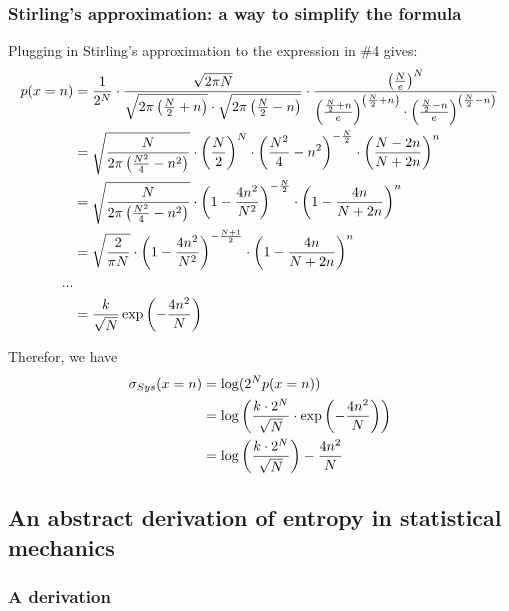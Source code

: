 \documentclass{paper}
\begin{document}
\subsubsection{Stirling's approximation: a way to simplify the formula}

\par Plugging in Stirling's approximation to the expression in \#4 gives:
    \begin{align*}
        p(x=n) 
        &= \frac{1}{2^N} \cdot \frac{\sqrt{2\pi N}}{\sqrt{2\pi \left(\frac{N}{2} + n\right)} \cdot \sqrt{2\pi \left(\frac{N}{2} - n\right)}} \cdot \frac{\left(\frac{N}{e}\right)^N}{\left(\frac{\frac{N}{2} + n}{e}\right)^{\left(\frac{N}{2} + n\right)} \cdot \left(\frac{\frac{N}{2} - n}{e}\right)^{\left(\frac{N}{2} - n\right)}}\\
        &= \sqrt{\frac{N}{2\pi \left(\frac{N^2}{4} - n^2\right)}} \cdot \left(\frac{N}{2}\right)^N \cdot \left(\frac{N^2}{4} - n^2\right)^{-\frac{N}{2}} \cdot \left(\frac{N-2n}{N+2n}\right)^n \\
        &= \sqrt{\frac{N}{2\pi \left(\frac{N^2}{4} - n^2\right)}} \cdot \left(1 - \frac{4n^2}{N^2}\right)^{-\frac{N}{2}} \cdot \left(1 - \frac{4n}{N+2n}\right)^n \\
        &= \sqrt{\frac{2}{\pi N}} \cdot \left(1 - \frac{4n^2}{N^2}\right)^{-\frac{N+1}{2}} \cdot \left(1 - \frac{4n}{N+2n}\right)^n \\
        ...\\
        &= \frac{k}{\sqrt{N}} \exp \left( -\frac{4n^2}{N} \right)
    \end{align*}

\par Therefor, we have
    \begin{align*}
        \sigma_{Sys}(x=n) &= \log(2^N p(x=n)) \\
        &= \log \left( \frac{k \cdot 2^N}{\sqrt{N}} \cdot \exp \left( -\frac{4n^2}{N} \right) \right) \\
        &= \log \left( \frac{k \cdot 2^N}{\sqrt{N}} \right) - \frac{4n^2}{N}
    \end{align*}

\subsection{An abstract derivation of entropy in statistical mechanics}
\subsubsection{A derivation}
\end{document}
